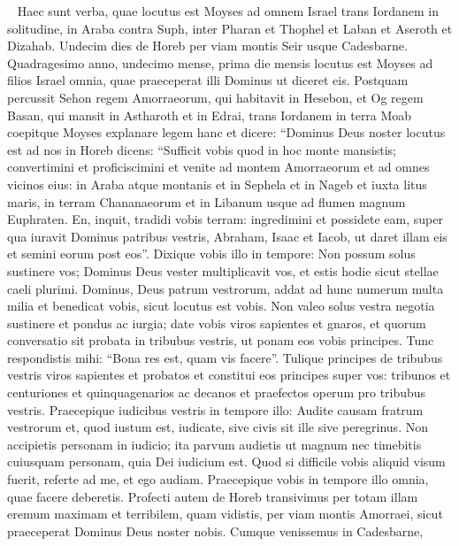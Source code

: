 
\begin{biblechapter}  
\verse Haec sunt verba, quae locutus est Moyses ad omnem Israel trans Iordanem in solitudine, in Araba contra Suph, inter Pharan et Thophel et Laban et Aseroth et Dizahab. 
\verse Undecim dies de Horeb per viam montis Seir usque Cadesbarne. 
\verse Quadragesimo anno, undecimo mense, prima die mensis locutus est Moyses ad filios Israel omnia, quae praeceperat illi Dominus ut diceret eis. 
\verse Postquam percussit Sehon regem Amorraeorum, qui habitavit in Hesebon, et Og regem Basan, qui mansit in Astharoth et in Edrai, 
\verse trans Iordanem in terra Moab coepitque Moyses explanare legem hanc et dicere: 
\verse “Dominus Deus noster locutus est ad nos in Horeb dicens: “Sufficit vobis quod in hoc monte mansistis; 
\verse convertimini et proficiscimini et venite ad montem Amorraeorum et ad omnes vicinos eius: in Araba atque montanis et in Sephela et in Nageb et iuxta litus maris, in terram Chananaeorum et in Libanum usque ad flumen magnum Euphraten. 
\verse En, inquit, tradidi vobis terram: ingredimini et possidete eam, super qua iuravit Dominus patribus vestris, Abraham, Isaac et Iacob, ut daret illam eis et semini eorum post eos”. 
\verse Dixique vobis illo in tempore: Non possum solus sustinere vos; 
\verse Dominus Deus vester multiplicavit vos, et estis hodie sicut stellae caeli plurimi.  
\verse Dominus, Deus patrum vestrorum, addat ad hunc numerum multa milia et benedicat vobis, sicut locutus est vobis. 
\verse Non valeo solus vestra negotia sustinere et pondus ac iurgia; 
\verse date vobis viros sapientes et gnaros, et quorum conversatio sit probata in tribubus vestris, ut ponam eos vobis principes. 
\verse Tunc respondistis mihi: “Bona res est, quam vis facere”.  
\verse Tulique principes de tribubus vestris viros sapientes et probatos et constitui eos principes super vos: tribunos et centuriones et quinquagenarios ac decanos et praefectos operum pro tribubus vestris. 
\verse Praecepique iudicibus vestris in tempore illo: Audite causam fratrum vestrorum et, quod iustum est, iudicate, sive civis sit ille sive peregrinus. 
\verse Non accipietis personam in iudicio; ita parvum audietis ut magnum nec timebitis cuiusquam personam, quia Dei iudicium est. Quod si difficile vobis aliquid visum fuerit, referte ad me, et ego audiam. 
\verse Praecepique vobis in tempore illo omnia, quae facere deberetis. 
\verse Profecti autem de Horeb transivimus per totam illam eremum maximam et terribilem, quam vidistis, per viam montis Amorraei, sicut praeceperat Dominus Deus noster nobis. Cumque venissemus in Cadesbarne, 

\end{biblechapter}
